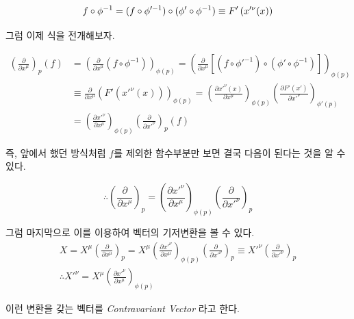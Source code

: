 \documentclass[final]{IEEEphot} %
\numberwithin{equation}{section} %
\numberwithin{figure}{section} %
\numberwithin{table}{section} %
\theoremstyle{plain}
\newcommand{\VS}{\vspace{0.3cm}}
\newcommand{\PD}[2]{\frac{\partial #1}{\partial #2}}
\newcommand{\BKS}[1]{\left( #1 \right)}
\newcommand{\Basis}[1][\mu]{\BKS{\PD{}{x^{#1}}}_p}
\begin{document}
\begin{equation*}
 f\circ\phi^{-1} = (f\circ\phi'^{-1})\circ(\phi'\circ\phi^{-1}) \equiv F'\BKS{x'^{\nu} (x)}\footnotemark
\end{equation*}

그럼 이제 식을 전개해보자.

\begin{equation}
  \begin{split}
    \Basis (f) & = \BKS{\PD{}{x^{\mu}} (f\circ\phi^{-1})}_{\phi(p)} = \BKS{\PD{}{x^{\mu}} \left[ (f\circ\phi'^{-1})\circ(\phi'\circ\phi^{-1}) \right]}_{\phi(p)} \\
    & \equiv \PD{}{x^{\mu}} \BKS{F'(x'^{\nu}(x))}_{\phi(p)} = \BKS{\PD{x'^{\nu}(x)}{x^{\mu}}}_{\phi(p)}\BKS{\PD{F'(x')}{x'^{\nu}}}_{\phi'(p)} \\
    & = \BKS{\PD{x'^{\nu}}{x^{\mu}}}_{\phi(p)}\BKS{\PD{}{x'^{\nu}}}_p (f)
  \end{split}
\end{equation}

즉, 앞에서 했던 방식처럼 $f$를 제외한 함수부분만 보면 결국 다음이 된다는 것을 알 수 있다.

\begin{equation}
 \therefore \Basis = \BKS{\PD{x'^{\nu}}{x^{\mu}}}_{\phi(p)}\BKS{\PD{}{x'^{\nu}}}_p
\end{equation}

그럼 마지막으로 이를 이용하여 벡터의 기저변환을 볼 수 있다.
\begin{gather}
 X = X^{\mu} \Basis = X^{\mu} \BKS{\PD{x'^{\nu}}{x^{\mu}}}_{\phi(p)} \BKS{\PD{}{x'^{\nu}}}_p \equiv X'^{\nu} \BKS{\PD{}{x'^{\nu}}}_p \\
 \therefore X'^{\nu} = X^{\mu} \BKS{\PD{x'^{\nu}}{x^{\mu}}}_{\phi(p)}
\end{gather}

이런 변환을 갖는 벡터를 \emph{Contravariant Vector} 라고 한다.

\VS
\end{document}

